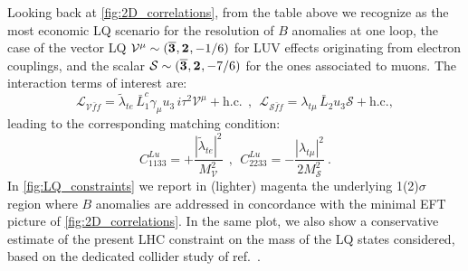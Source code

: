 Looking back at \autoref{fig:2D_correlations}, from the table above we recognize as the most economic LQ scenario for the resolution of $B$ anomalies at one loop, the case of the vector LQ $ \mathcal V^\mu\sim(\overline{\irrep{3}},\irrep{2}, -1/6 )$ for LUV effects originating from electron couplings, and the scalar $\mathcal S\sim (\overline{\irrep{3}},\irrep{2} ,-7/6 )$ for the ones associated to muons.
The interaction terms of interest are:
\begin{equation}
	\mathcal{L}_{\mathcal V \bar f f} =  \tilde \lambda_{t e}  \, \bar L^c_1\gamma_\mu u_{3} \, i \tau^2 \mathcal V^\mu  + \mathrm{h.c.} 
	\ \ , \ \
	\mathcal{L}_{\mathcal S \bar f f} =  \lambda_{t \mu} \,  \bar L_2 u_{3} \mathcal{S}  + \mathrm{h.c.} ,
\end{equation}
leading to the corresponding matching condition:
\begin{equation}
	C^{Lu}_{1133} = +\frac{| \tilde \lambda_{t e}|^2}{M_{\mathcal V} ^2 }  
	\ \ , \ \ C^{Lu}_{2233} = -\frac{|  \lambda_{t \mu}|^2}{2 M_{\mathcal S}^2 } \ .
\end{equation}
In \autoref{fig:LQ_constraints} we report in (lighter) magenta the underlying 1(2)$\sigma$ region where $B$ anomalies are addressed in concordance with the minimal EFT picture of \autoref{fig:2D_correlations}. In the same plot, we also show a conservative estimate of the present LHC constraint on the mass of the LQ states considered, based on the dedicated collider study of ref.~\cite{Angelescu:2018tyl}.

